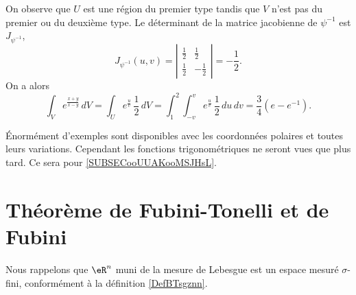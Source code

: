 \begin{example}
On observe que $U$ est une région du premier type tandis que $V$ n'est pas du premier ou du deuxième type. Le déterminant de la  matrice  jacobienne de $\psi^{-1}$ est  $J_{\psi^{-1}}$,
\begin{equation}
 J_{\psi^{-1}}(u,v)= \left\vert\begin{array}{cc}
\frac{1}{2} & \frac{1}{2} \\
\frac{1}{2}  & -\frac{1}{2}
\end{array}\right\vert= -\frac{1}{2}.
\end{equation}
On a alors 
\[
\int_{V}e^{\frac{x+y}{x-y}}\,dV=\int_{U}e^{\frac{u}{v}}\,\frac{1}{2}\,dV=\int_1^2\int_{-v}^{v}e^{\frac{u}{v}}\,\frac{1}{2}\, du\,dv= \frac{3}{4}(e-e^{-1}).
\] 
\end{example}

Énormément d'exemples sont disponibles avec les coordonnées polaires et toutes leurs variations. Cependant les fonctions trigonométriques ne seront vues que plus tard. Ce sera pour \ref{SUBSECooUUAKooMSJHsL}.

\section{Théorème de Fubini-Tonelli et de Fubini}

Nous rappelons que \( \eR^n\) muni de la mesure de Lebesgue est un espace mesuré \( \sigma\)-fini, conformément à la définition \ref{DefBTsgznn}.

